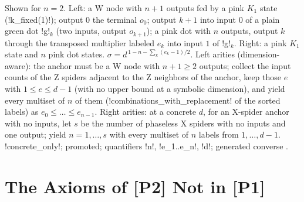 Shown for $n=2$. Left: a W node with $n+1$ outputs fed by a pink $K_1$ state (\py!k_fixed(1)!);
output $0$ the terminal $o_0$; output $k+1$ into input $0$ of a plain green dot \code!g!$_k$ (two
inputs, output $o_{k+1}$); a pink dot with $n$ outputs, output $k$ through the transposed
multiplier labeled $e_k$ into input $1$ of \code!g!$_k$. Right: a pink $K_1$ state and $n$ pink
dot states. $\sigma=d^{\,1-n-\sum_k (e_k-1)/2}$. Left arities (dimension-aware): the anchor must
be a W node with $n+1\ge2$ outputs; collect the input counts of the Z spiders adjacent to the Z
neighbors of the anchor, keep those $e$ with $1\le e\le d-1$ (with no upper bound at a symbolic
dimension), and yield every multiset of $n$ of them (\py!combinations_with_replacement! of the
sorted labels) as $e_0\le\dots\le e_{n-1}$. Right arities: at a concrete $d$, for an X-spider
anchor with no inputs, let $s$ be the number of phaseless X spiders with no inputs and one
output; yield $n=1,\dots,s$ with every multiset of $n$ labels from $1,\dots,d-1$.
\py!concrete_only!; promoted; quantifiers \code!n!, \code!e_1..e_n!, \code!d!; generated
converse .


\section{The Axioms of [P2] Not in [P1]}\label{sec:completeness-p2}

